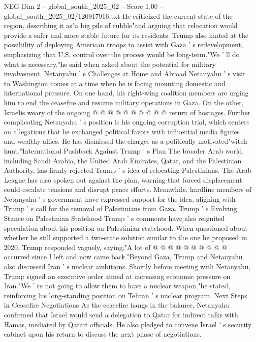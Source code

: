 \begin{textsample}{NEG Dim 2 – global\_south\_2025\_02 – Score 1.00 – global\_south\_2025\_02/120917916.txt}
He criticized the current state of the region, describing it as"a big pile of rubble"and arguing that relocation would provide a safer and more stable future for its residents.
Trump also hinted at the possibility of deploying American troops to assist with Gaza ' s redevelopment, emphasizing that U.S. control over the process would be long-term."We ' ll do what is necessary,"he said when asked about the potential for military involvement.
Netanyahu ' s Challenges at Home and Abroad Netanyahu ' s visit to Washington comes at a time when he is facing mounting domestic and international pressure.
On one hand, his right-wing coalition members are urging him to end the ceasefire and resume military operations in Gaza.
On the other, Israelis weary of the ongoing @ @ @ @ @ @ @ @ @ @ return of hostages.
Further complicating Netanyahu ' s position is his ongoing corruption trial, which centers on allegations that he exchanged political favors with influential media figures and wealthy allies.
He has dismissed the charges as a politically motivated"witch hunt."International Pushback Against Trump ' s Plan The broader Arab world, including Saudi Arabia, the United Arab Emirates, Qatar, and the Palestinian Authority, has firmly rejected Trump ' s idea of relocating Palestinians.
The Arab League has also spoken out against the plan, warning that forced displacement could escalate tensions and disrupt peace efforts.
Meanwhile, hardline members of Netanyahu ' s government have expressed support for the idea, aligning with Trump ' s call for the removal of Palestinians from Gaza.
Trump ' s Evolving Stance on Palestinian Statehood Trump ' s comments have also reignited speculation about his position on Palestinian statehood.
When questioned about whether he still supported a two-state solution similar to the one he proposed in 2020, Trump responded vaguely, saying,"A lot of @ @ @ @ @ @ @ @ @ @ occurred since I left and now came back."Beyond Gaza, Trump and Netanyahu also discussed Iran ' s nuclear ambitions.
Shortly before meeting with Netanyahu, Trump signed an executive order aimed at increasing economic pressure on Iran."We ' re not going to allow them to have a nuclear weapon,"he stated, reinforcing his long-standing position on Tehran ' s nuclear program.
Next Steps in Ceasefire Negotiations As the ceasefire hangs in the balance, Netanyahu confirmed that Israel would send a delegation to Qatar for indirect talks with Hamas, mediated by Qatari officials.
He also pledged to convene Israel ' s security cabinet upon his return to discuss the next phase of negotiations.

\end{textsample}
